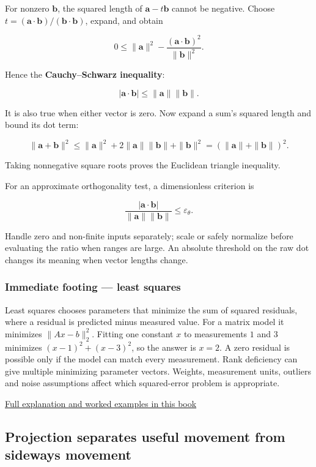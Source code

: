 For nonzero \(\mathbf b\), the squared length of \(\mathbf a-t\mathbf b\) cannot be negative. Choose \(t=(\mathbf a\cdot\mathbf b)/(\mathbf b\cdot\mathbf b)\), expand, and obtain

\[
0\le\|\mathbf a\|^2-
\frac{(\mathbf a\cdot\mathbf b)^2}{\|\mathbf b\|^2}.
\]

Hence the \textbf{Cauchy--Schwarz inequality}:

\[
|\mathbf a\cdot\mathbf b|\le\|\mathbf a\|\|\mathbf b\|.
\]

It is also true when either vector is zero. Now expand a sum's squared length and bound its dot term:

\[
\|\mathbf a+\mathbf b\|^2
\le\|\mathbf a\|^2+2\|\mathbf a\|\|\mathbf b\|+\|\mathbf b\|^2
=(\|\mathbf a\|+\|\mathbf b\|)^2.
\]

Taking nonnegative square roots proves the Euclidean triangle inequality.

For an approximate orthogonality test, a dimensionless criterion is

\[
\frac{|\mathbf a\cdot\mathbf b|}{\|\mathbf a\|\|\mathbf b\|}
\le\varepsilon_\theta.
\]

Handle zero and non-finite inputs separately; scale or safely normalize before evaluating the ratio when ranges are large. An absolute threshold on the raw dot changes its meaning when vector lengths change.

\subsubsection{Immediate footing --- least squares}\label{immediate-footing-least-squares}

Least squares chooses parameters that minimize the sum of squared residuals, where a residual is predicted minus measured value. For a matrix model it minimizes \(\lVert Ax-b\rVert_2^2\). Fitting one constant \(x\) to measurements \(1\) and \(3\) minimizes \((x-1)^2+(x-3)^2\), so the answer is \(x=2\). A zero residual is possible only if the model can match every measurement. Rank deficiency can give multiple minimizing parameter vectors. Weights, measurement units, outliers and noise assumptions affect which squared-error problem is appropriate.

\hyperref[01-foundations-i-ch020]{Full explanation and worked examples in this book}

\subsection{Projection separates useful movement from sideways movement}\label{projection-separates-useful-movement-from-sideways-movement}

